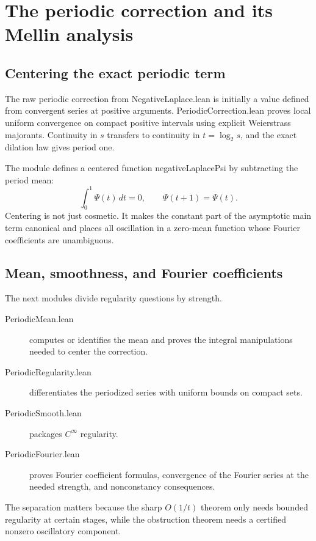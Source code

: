 \documentclass[11pt,a4paper,openany]{book}
\def\module#1{#1.lean}
\def\decl#1{#1}
\newcommand{\module}[1]{\nolinkurl{#1.lean}}
\newcommand{\decl}[1]{\texttt{\detokenize{#1}}}
\begin{document}
\chapter{The periodic correction and its Mellin analysis}
\label{ch:periodic}

\section{Centering the exact periodic term}
The raw periodic correction from \module{NegativeLaplace} is initially a value
defined from convergent series at positive arguments.  \module{PeriodicCorrection}
proves local uniform convergence on compact positive intervals using explicit
Weierstrass majorants.  Continuity in $s$ transfers to continuity in
$t=\log_2s$, and the exact dilation law gives period one.

The module defines a centered function \decl{negativeLaplacePsi} by subtracting
the period mean:
\[
 \int_0^1\Psi(t)\,dt=0,
 \qquad \Psi(t+1)=\Psi(t).
\]
Centering is not just cosmetic.  It makes the constant part of the asymptotic
main term canonical and places all oscillation in a zero-mean function whose
Fourier coefficients are unambiguous.

\section{Mean, smoothness, and Fourier coefficients}
The next modules divide regularity questions by strength.
\begin{description}
\item[\module{PeriodicMean}] computes or identifies the mean and proves the
integral manipulations needed to center the correction.
\item[\module{PeriodicRegularity}] differentiates the periodized series with
uniform bounds on compact sets.
\item[\module{PeriodicSmooth}] packages $C^\infty$ regularity.
\item[\module{PeriodicFourier}] proves Fourier coefficient formulas, convergence
of the Fourier series at the needed strength, and nonconstancy consequences.
\end{description}
The separation matters because the sharp $O(1/t)$ theorem only needs bounded
regularity at certain stages, while the obstruction theorem needs a certified
nonzero oscillatory component.
\end{document}
